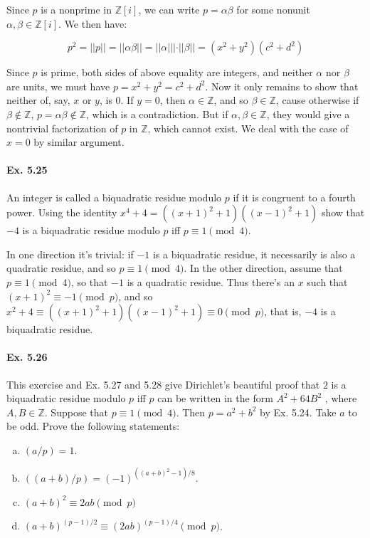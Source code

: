 \documentclass[notitlepage]{article}
\theoremstyle{definition}
\newcommand\Z{\mathbb{Z}}
\begin{document}
Since $p$ is a nonprime in $\Z[i]$, we can write $p = \alpha \beta$
for some nonunit $\alpha, \beta \in \Z[i]$. We then have:

\begin{equation}
  p^2 = ||p|| = ||\alpha \beta|| = ||\alpha|||\cdot||\beta|| = (x^2 + y^2)(c^2 + d^2)
\end{equation}

Since $p$ is prime, both sides of above equality are integers, and
neither $\alpha$ nor $\beta$ are units, we must have $p = x^2 + y^2 =
c^2 + d^2$. Now it only remains to show that neither of, say, $x$ or
$y$, is $0$. If $y = 0$, then $\alpha \in \Z$, and so $\beta \in \Z$,
cause otherwise if $\beta \not \in \Z$, $p = \alpha \beta \not \in
\Z$, which is a contradiction. But if $\alpha, \beta \in \Z$, they
would give a nontrivial factorization of $p$ in $\Z$, which cannot
exist. We deal with the case of $x = 0$ by similar argument.

\paragraph{Ex. 5.25}
An integer is called a biquadratic residue modulo $p$ if it is
congruent to a fourth power. Using the identity $x^4 + 4 = ((x + 1)^2
+ 1)((x - 1)^2 + 1)$ show that $-4$ is a biquadratic residue modulo $p$
iff $p \equiv 1 \pmod 4$.

In one direction it's trivial: if $-1$ is a biquadratic residue, it
necessarily is also a quadratic residue, and so $p \equiv 1 \pmod
4$. In the other direction, assume that $p \equiv 1 \pmod 4$, so that
$-1$ is a quadratic residue. Thus there's an $x$ such that $(x+1)^2
\equiv -1 \pmod p$, and so $x^2 + 4 \equiv ((x+1)^2 + 1)((x-1)^2 + 1)
\equiv 0 \pmod p$, that is, $-4$ is a biquadratic residue.

\paragraph{Ex. 5.26}
This exercise and Ex. 5.27 and 5.28 give Dirichlet's beautiful proof
that $2$ is a biquadratic residue modulo $p$ iff $p$ can be written in
the form $A^2 + 64B^2$ , where $A, B \in \Z$. Suppose that $p \equiv 1
\pmod 4$. Then $p = a^2 + b^2$ by Ex. 5.24. Take $a$ to be odd.  Prove
the following statements:

\begin{enumerate}[a)]
\item $(a/p) = 1$.
\item $((a + b)/p) = (-1)^{((a+b)^2 -1)/8}$.
\item $(a + b)^2 \equiv 2ab \pmod p$
\item $(a + b)^{(p- 1)/2} \equiv (2ab)^{(p- 1)/4} \pmod p$.
\end{enumerate}
\end{document}
